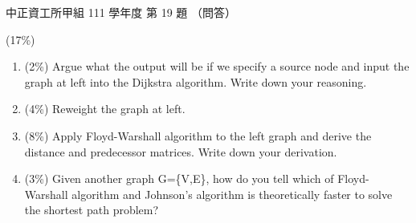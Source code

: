 \begin{pastexam}[label={px:ccu-111-swa-11}]{中正資工所甲組 111 學年度 第 19 題}
（問答）

(17\%)
\begin{center}
\end{center}
\begin{enumerate}[label=\alph*.,itemsep=2pt,topsep=2pt]
\item (2\%) Argue what the output will be if we specify a source node and input the graph at
left into the Dijkstra algorithm. Write down your reasoning.
\item (4\%) Reweight the graph at left.
\item (8\%) Apply Floyd-Warshall algorithm to the left graph and derive the distance and
predecessor matrices. Write down your derivation.
\item (3\%) Given another graph G=\{V,E\}, how do you tell which of Floyd-Warshall algorithm and
Johnson's algorithm is theoretically faster to solve the shortest path problem?
\end{enumerate}
\end{pastexam}

